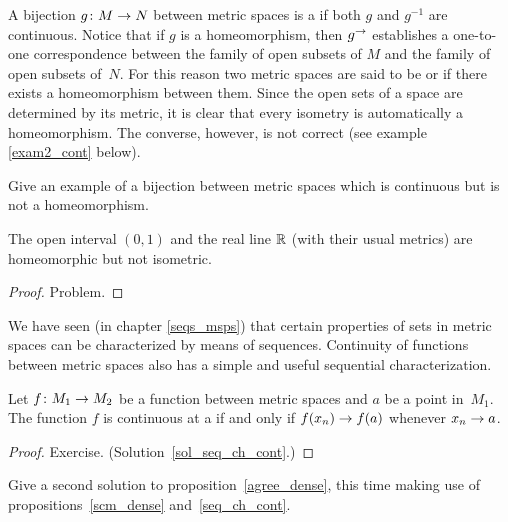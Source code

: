 \begin{defn} A bijection $g\colon M\rightarrow N$ between metric spaces is a
 if both $g$ and $g^{-1}$ are continuous.  Notice that if $g$ is a
homeomorphism, then $g^{\rightarrow}$ establishes a one-to-one correspondence between the family
of open subsets of $M$ and the family of open subsets of~$N$.  For this reason two metric
spaces are said to be
 or
 if there exists a homeomorphism between them.  Since the open sets of a
space are determined by its metric, it is clear that every isometry is automatically a
homeomorphism. The converse, however, is not correct (see example \ref{exam2_cont}
below).
\end{defn}


\begin{prob} Give an example of a bijection between metric spaces which is continuous but is not
a homeomorphism.
\end{prob}

\begin{exam}\label{exam2_cont} The open interval $(0,1)$ and the real line $\mathbb{R}$ (with their usual
metrics) are homeomorphic but not isometric.
\end{exam}

\begin{proof} Problem.  \ns  \end{proof}

We have seen (in chapter \ref{seqs_msps}) that  certain properties of sets in metric spaces can be
characterized by means of sequences.  Continuity of functions between metric spaces also has a
simple and useful sequential characterization.

\begin{prop}\label{seq_ch_cont} Let $f \colon M_1 \rightarrow M_2$ be a function between metric spaces
and $a$ be a point in~$M_1$.  The function $f$ is continuous at a if and only if $f(x_n) \rightarrow f(a)$
whenever $x_n \rightarrow a$.
\end{prop}

\begin{proof} Exercise. (Solution~\ref{sol_seq_ch_cont}.)
  \ns \end{proof}

\begin{prob} Give a second solution to proposition~\ref{agree_dense}, this time making use of
propositions~\ref{scm_dense} and~\ref{seq_ch_cont}.
\end{prob}

